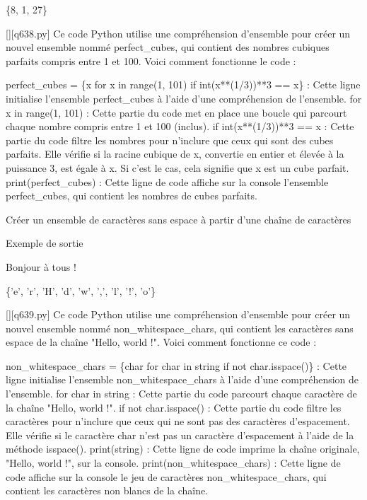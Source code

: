 \{8, 1, 27\}
        \par
        \begin{solution}
            \renewcommand{\nomfichier}{q638.py}
            \pythonfile{\chemincode \nomfichier}[][\nomfichier]
            Ce code Python utilise une compréhension d'ensemble pour créer un nouvel ensemble nommé perfect\_cubes, qui contient des nombres cubiques parfaits compris entre 1 et 100. Voici comment fonctionne le code :

    perfect\_cubes = \{x for x in range(1, 101) if int(x**(1/3))**3 == x\} : Cette ligne initialise l'ensemble perfect\_cubes à l'aide d'une compréhension de l'ensemble.
        for x in range(1, 101) : Cette partie du code met en place une boucle qui parcourt chaque nombre compris entre 1 et 100 (inclus).
        if int(x**(1/3))**3 == x : Cette partie du code filtre les nombres pour n'inclure que ceux qui sont des cubes parfaits. Elle vérifie si la racine cubique de x, convertie en entier et élevée à la puissance 3, est égale à x. Si c'est le cas, cela signifie que x est un cube parfait.
    print(perfect\_cubes) : Cette ligne de code affiche sur la console l'ensemble perfect\_cubes, qui contient les nombres de cubes parfaits.
        \end{solution}
        

        \question
        Créer un ensemble de caractères sans espace à partir d'une chaîne de caractères

Exemple de sortie

Bonjour à tous !

\{'e', 'r', 'H', 'd', 'w', ',', 'l', '!', 'o'\}
        \par
        \begin{solution}
            \renewcommand{\nomfichier}{q639.py}
            \pythonfile{\chemincode \nomfichier}[][\nomfichier]
            Ce code Python utilise une compréhension d'ensemble pour créer un nouvel ensemble nommé non\_whitespace\_chars, qui contient les caractères sans espace de la chaîne "Hello, world !". Voici comment fonctionne ce code :

    non\_whitespace\_chars = \{char for char in string if not char.isspace()\} : Cette ligne initialise l'ensemble non\_whitespace\_chars à l'aide d'une compréhension de l'ensemble.
        for char in string : Cette partie du code parcourt chaque caractère de la chaîne "Hello, world !".
        if not char.isspace() : Cette partie du code filtre les caractères pour n'inclure que ceux qui ne sont pas des caractères d'espacement. Elle vérifie si le caractère char n'est pas un caractère d'espacement à l'aide de la méthode isspace().
    print(string) : Cette ligne de code imprime la chaîne originale, "Hello, world !", sur la console.
    print(non\_whitespace\_chars) : Cette ligne de code affiche sur la console le jeu de caractères non\_whitespace\_chars, qui contient les caractères non blancs de la chaîne.
        \end{solution}
        

